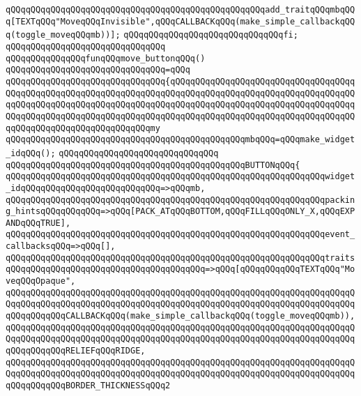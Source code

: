 \verb|qQQqqQQqqQQqqQQqqQQqqQQqqQQqqQQqqQQqqQQqqQQqqQQqqQQqadd_traitqQQqmbqQQq[TEXTqQQq"MoveqQQqInvisible",qQQqCALLBACKqQQq(make_simple_callbackqQQq(toggle_moveqQQqmb))];|\newline
\verb|qQQqqQQqqQQqqQQqqQQqqQQqqQQqqQQqfi;|\newline
\verb|qQQqqQQqqQQqqQQqqQQqqQQqqQQqqQQq|\newline
\newline
\verb|qQQqqQQqqQQqqQQqfunqQQqmove_buttonqQQq()|\newline
\verb|qQQqqQQqqQQqqQQqqQQqqQQqqQQqqQQq=qQQq|\newline
\verb|qQQqqQQqqQQqqQQqqQQqqQQqqQQqqQQq{qQQqqQQqqQQqqQQqqQQqqQQqqQQqqQQqqQQqqQQqqQQqqQQqqQQqqQQqqQQqqQQqqQQqqQQqqQQqqQQqqQQqqQQqqQQqqQQqqQQqqQQqqQQqqQQqqQQqqQQqqQQqqQQqqQQqqQQqqQQqqQQqqQQqqQQqqQQqqQQqqQQqqQQqqQQqqQQqqQQqqQQqqQQqqQQqqQQqqQQqqQQqqQQqqQQqqQQqqQQqqQQqqQQqqQQqqQQqqQQqqQQqqQQqqQQqqQQqqQQqqQQqqQQqqQQqqQQqmy|\newline
\verb|qQQqqQQqqQQqqQQqqQQqqQQqqQQqqQQqqQQqqQQqqQQqqQQqmbqQQq=qQQqmake_widget_idqQQq();|\newline
\verb|qQQqqQQqqQQqqQQqqQQqqQQqqQQqqQQq|\newline
\verb|qQQqqQQqqQQqqQQqqQQqqQQqqQQqqQQqqQQqqQQqqQQqqQQqBUTTONqQQq{|\newline
\verb|qQQqqQQqqQQqqQQqqQQqqQQqqQQqqQQqqQQqqQQqqQQqqQQqqQQqqQQqqQQqqQQqwidget_idqQQqqQQqqQQqqQQqqQQqqQQqqQQq=>qQQqmb,|\newline
\verb|qQQqqQQqqQQqqQQqqQQqqQQqqQQqqQQqqQQqqQQqqQQqqQQqqQQqqQQqqQQqqQQqpacking_hintsqQQqqQQqqQQq=>qQQq[PACK_ATqQQqBOTTOM,qQQqFILLqQQqONLY_X,qQQqEXPANDqQQqTRUE],|\newline
\verb|qQQqqQQqqQQqqQQqqQQqqQQqqQQqqQQqqQQqqQQqqQQqqQQqqQQqqQQqqQQqqQQqevent_callbacksqQQq=>qQQq[],|\newline
\verb|qQQqqQQqqQQqqQQqqQQqqQQqqQQqqQQqqQQqqQQqqQQqqQQqqQQqqQQqqQQqqQQqtraitsqQQqqQQqqQQqqQQqqQQqqQQqqQQqqQQqqQQqqQQq=>qQQq[qQQqqQQqqQQqTEXTqQQq"MoveqQQqOpaque",|\newline
\verb|qQQqqQQqqQQqqQQqqQQqqQQqqQQqqQQqqQQqqQQqqQQqqQQqqQQqqQQqqQQqqQQqqQQqqQQqqQQqqQQqqQQqqQQqqQQqqQQqqQQqqQQqqQQqqQQqqQQqqQQqqQQqqQQqqQQqqQQqqQQqqQQqqQQqqQQqCALLBACKqQQq(make_simple_callbackqQQq(toggle_moveqQQqmb)),|\newline
\verb|qQQqqQQqqQQqqQQqqQQqqQQqqQQqqQQqqQQqqQQqqQQqqQQqqQQqqQQqqQQqqQQqqQQqqQQqqQQqqQQqqQQqqQQqqQQqqQQqqQQqqQQqqQQqqQQqqQQqqQQqqQQqqQQqqQQqqQQqqQQqqQQqqQQqqQQqRELIEFqQQqRIDGE,|\newline
\verb|qQQqqQQqqQQqqQQqqQQqqQQqqQQqqQQqqQQqqQQqqQQqqQQqqQQqqQQqqQQqqQQqqQQqqQQqqQQqqQQqqQQqqQQqqQQqqQQqqQQqqQQqqQQqqQQqqQQqqQQqqQQqqQQqqQQqqQQqqQQqqQQqqQQqqQQqBORDER_THICKNESSqQQq2|\newline
